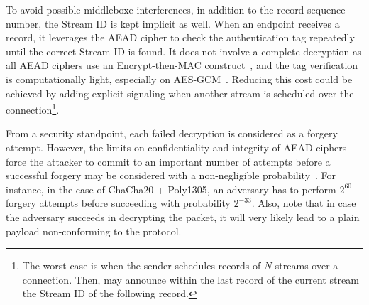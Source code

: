 To avoid possible middleboxe interferences, in addition to the record sequence
number, the \tcpls Stream ID is kept implicit as well. When an endpoint receives
a \tcpls record, it leverages the AEAD cipher to check the authentication tag
repeatedly until the correct \tcpls Stream ID is found.
It does not involve a complete decryption as all  AEAD
ciphers use an Encrypt-then-MAC construct~\cite{rfc7366, rfc8446}, and the tag
verification is computationally light, especially on
AES-GCM~\cite{mcgrew2004galois}. Reducing this cost could be achieved by adding
explicit signaling when another stream is scheduled over the \tcp
connection\footnote{The worst case is when the sender schedules records of $N$
  streams over a \tcp connection. Then, \tcpls may announce within the last
  record of the current stream the Stream ID of the following record.%
}.

From a security standpoint, each failed decryption is considered as a forgery
attempt. However, the limits on confidentiality and integrity of AEAD ciphers
force the attacker to commit to an important number of attempts before a
successful forgery may be considered with a non-negligible
probability~\cite{luykx2015limits, aeadlimits}. For instance, in the case of
ChaCha20 + Poly1305, an adversary has to perform $2^{60}$ forgery attempts
before succeeding with probability $2^{-33}$. Also, note that in case the 
adversary succeeds in decrypting the packet, it will very likely lead to a 
plain payload non-conforming to the \tcpls protocol.




